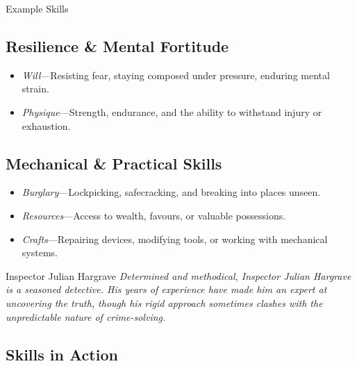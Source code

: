 \begin{WyrdExampleSidebar}[float=!t]{Example Skills}
	\subsection*{Resilience \& Mental Fortitude}  
	\begin{itemize}
    	\item \emph{Will}---Resisting fear, staying composed under pressure, enduring mental strain.
	    \item \emph{Physique}---Strength, endurance, and the ability to withstand injury or exhaustion.
	\end{itemize}

	\subsection*{Mechanical \& Practical Skills}  
	\begin{itemize}
    	\item \emph{Burglary}---Lockpicking, safecracking, and breaking into places unseen.
	    \item \emph{Resources}---Access to wealth, favours, or valuable possessions.
	    \item \emph{Crafts}---Repairing devices, modifying tools, or working with mechanical systems.
	\end{itemize}
\end{WyrdExampleSidebar}

\begin{WyrdNPC}[float=!t]{Inspector Julian Hargrave}
	\emph{Determined and methodical, Inspector Julian Hargrave is a seasoned detective. His years of experience have made him an expert at uncovering the truth, though his rigid approach sometimes clashes with the unpredictable nature of crime-solving.}

	\vspace{0.5\baselineskip}
	\SkillsBox[%
		expert={Investigate},%
		skilled={Notice, Rapport},%
		novice={Will, Provoke, Athletics},%
		untrained={Stealth, Burglary, Shoot, Resources}%
	]

\end{WyrdNPC}

\clearpage



\subsection{Skills in Action}

